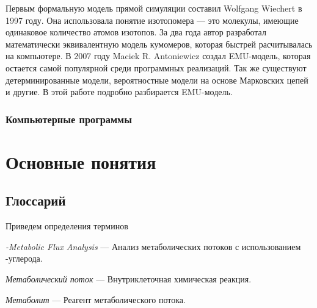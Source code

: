 \documentclass[a4paper, 12pt, left=30mm, right=15mm, top=20mm, bottom=20mm]{report}
\begin{document}
Первым формальную модель прямой симуляции составил 	
Wolfgang Wiechert\cite{Wiechert_1997_1, Wiechert_1997_2} в 1997 году. Она использовала понятие изотопомера --- это молекулы, имеющие одинаковое количество атомов изотопов. За два года автор разработал математически эквивалентную модель кумомеров\cite{Wiechert_1999_3, Wiechert_1999_4}, которая быстрей расчитывалась на компьютере. В 2007 году Maciek R. Antoniewicz создал EMU-модель\cite{EMU_2007}, которая остается самой популярной среди программных реализаций. Так же существуют детерминированные модели\cite{Direct_MFA}, вероятностные модели на основе Марковских цепей\cite{Markov_chain_MFA} и другие\cite{Fluxomer_MFA}. В этой работе подробно разбирается EMU-модель.

\subsection{Компьютерные программы}

\chapter{Основные понятия}
\section{Глоссарий}
Приведем определения терминов 

\emph{-Metabolic Flux Analysis} --- Анализ метаболических потоков с использованием -углерода.

\emph{Метаболический поток} --- Внутриклеточная химическая реакция.

\emph{Метаболит} --- Реагент метаболического потока.
\clearpage
\end{document}
